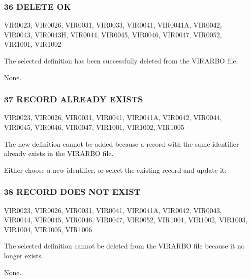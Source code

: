 \documentclass[letterpaper,10pt,english]{sphinxmanual}
\begin{document}
\subsubsection{36 DELETE OK}
\label{\detokenize{messages:delete-ok}}\begin{description}
\sphinxAtStartPar
VIR0023, VIR0026, VIR0031, VIR0033, VIR0041, VIR0041A, VIR0042, VIR0043, VIR0043H, VIR0044, VIR0045, VIR0046, VIR0047, VIR0052, VIR1001, VIR1002

\sphinxAtStartPar
The selected definition has been successfully deleted from the VIRARBO file.

\sphinxAtStartPar
None.

\end{description}


\subsubsection{37 RECORD ALREADY EXISTS}
\label{\detokenize{messages:record-already-exists}}\begin{description}
\sphinxAtStartPar
VIR0023, VIR0026, VIR0031, VIR0041, VIR0041A, VIR0042, VIR0044, VIR0045, VIR0046, VIR0047, VIR1001, VIR1002, VIR1005

\sphinxAtStartPar
The new definition cannot be added because a record with the same identifier already exists in the VIRARBO file.

\sphinxAtStartPar
Either choose a new identifier, or select the existing record and update it.

\end{description}


\subsubsection{38 RECORD DOES NOT EXIST}
\label{\detokenize{messages:record-does-not-exist}}\begin{description}
\sphinxAtStartPar
VIR0023, VIR0026, VIR0031, VIR0041, VIR0041A, VIR0042, VIR0043, VIR0044, VIR0045, VIR0046, VIR0047, VIR0052, VIR1001, VIR1002, VIR1003, VIR1004, VIR1005, VIR1006

\sphinxAtStartPar
The selected definition cannot be deleted from the VIRARBO file because it no longer exists.

\sphinxAtStartPar
None.

\end{description}
\end{document}
